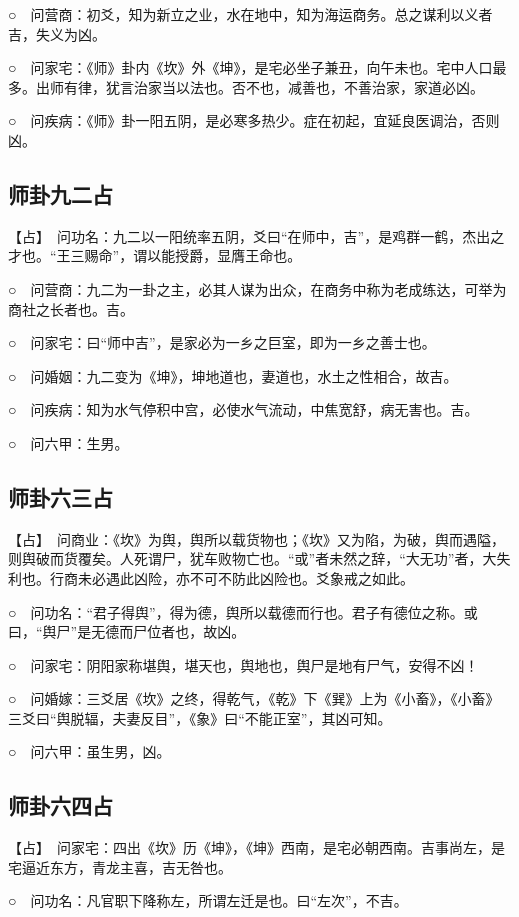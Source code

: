 \documentclass[12pt,oneside]{book}
\begin{document}
○　问营商：初爻，知为新立之业，水在地中，知为海运商务。总之谋利以义者吉，失义为凶。

○　问家宅：《师》卦内《坎》外《坤》，是宅必坐子兼丑，向午未也。宅中人口最多。出师有律，犹言治家当以法也。否不也，减善也，不善治家，家道必凶。

○　问疾病：《师》卦一阳五阴，是必寒多热少。症在初起，宜延良医调治，否则凶。

\subsection{师卦九二占}
【占】　问功名：九二以一阳统率五阴，爻曰“在师中，吉”，是鸡群一鹤，杰出之才也。“王三赐命”，谓以能授爵，显膺王命也。

○　问营商：九二为一卦之主，必其人谋为出众，在商务中称为老成练达，可举为商社之长者也。吉。

○　问家宅：曰“师中吉”，是家必为一乡之巨室，即为一乡之善士也。

○　问婚姻：九二变为《坤》，坤地道也，妻道也，水土之性相合，故吉。

○　问疾病：知为水气停积中宫，必使水气流动，中焦宽舒，病无害也。吉。

○　问六甲：生男。

\subsection{师卦六三占}
【占】　问商业：《坎》为舆，舆所以载货物也；《坎》又为陷，为破，舆而遇隘，则舆破而货覆矣。人死谓尸，犹车败物亡也。“或”者未然之辞，“大无功”者，大失利也。行商未必遇此凶险，亦不可不防此凶险也。爻象戒之如此。

○　问功名：“君子得舆”，得为德，舆所以载德而行也。君子有德位之称。或曰，“舆尸”是无德而尸位者也，故凶。

○　问家宅：阴阳家称堪舆，堪天也，舆地也，舆尸是地有尸气，安得不凶！

○　问婚嫁：三爻居《坎》之终，得乾气，《乾》下《巽》上为《小畜》，《小畜》三爻曰“舆脱辐，夫妻反目”，《象》曰“不能正室”，其凶可知。

○　问六甲：虽生男，凶。

\subsection{师卦六四占}
【占】　问家宅：四出《坎》历《坤》，《坤》西南，是宅必朝西南。吉事尚左，是宅逼近东方，青龙主喜，吉无咎也。

○　问功名：凡官职下降称左，所谓左迁是也。曰“左次”，不吉。
\end{document}
